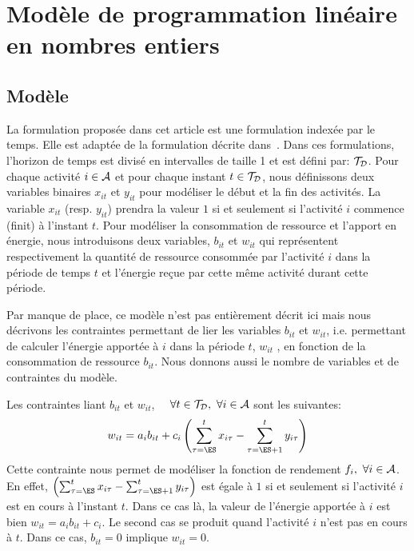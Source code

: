 \section{Modèle de programmation linéaire en nombres entiers}
\label{MIP}
\subsection{Modèle}
La formulation proposée dans cet article est une formulation indexée par
le temps. Elle est adaptée de la formulation décrite
dans~\cite{Nattaf2015}. 
Dans ces formulations, l'horizon de temps est divisé en
intervalles de taille 1 et est défini par: ${\cal T}_{\cal D}$. 
Pour chaque activité $i \in {\cal A}$ et pour chaque instant $t \in
{\cal T}_{\cal D}$, nous définissons deux variables binaires $x_{it}$
et $y_{it}$ pour modéliser le début et la fin des activités. La
variable $x_{it}$ (resp. $y_{it}$) prendra la valeur $1$ si et
seulement si l'activité $i$ commence (finit) à l'instant $t$.
Pour modéliser la consommation de ressource et l'apport en énergie,
nous introduisons deux variables, $b_{it}$ et $w_{it}$ qui
représentent respectivement la quantité de
ressource consommée par l'activité $i$ dans la période de temps
$t$ et l'énergie reçue par cette même activité durant cette période. 

Par manque de place, ce modèle n'est pas entièrement décrit ici mais
nous décrivons les contraintes permettant de lier les variables
$b_{it}$ et $w_{it}$, i.e. permettant de calculer l'énergie apportée à
$i$ dans la période $t$, $w_{it}$ , en fonction de la consommation de
ressource $b_{it}$. Nous donnons aussi le nombre de variables et de
contraintes du modèle.

Les contraintes liant $b_{it}$ et $w_{it}$, $\quad \forall t\in {\cal T}_{\cal D},\
\forall i \in {\cal A}$ sont les suivantes:
\begin{equation}  w_{it}=a_ib_{it}+c_i\left(\sum_{\tau=\ES}^t
x_{i\tau}-\sum_{\tau=\ES+1}^t y_{i\tau}\right)  \label{conv_CECSP_TI}
\end{equation} Cette contrainte nous permet de modéliser la fonction
de rendement $f_i,\ \forall i \in {\cal A}$. En effet,
$\left(\sum_{\tau=\ES}^t x_{i\tau}-\sum_{\tau=\ES+1}^t
y_{i\tau}\right) $ est égale à $1$ si et seulement si l'activité $i$
est en cours à l'instant $t$.  Dans ce cas là, la valeur de l'énergie
apportée à $i$ est bien $w_{it}=a_ib_{it}+c_i$. Le second cas se
produit quand l'activité $i$ n'est pas en cours à $t$. Dans ce cas,
$b_{it}=0$ implique $w_{it}=0$.

